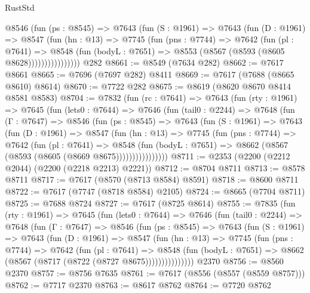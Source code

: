 \begin{lexlean}{RustStd}
\begin{coremodule}
              @8546
                (fun (ps : @8545) =>
                @7643
                  (fun (S : @1961) =>
                  @7643
                    (fun (D : @1961) =>
                    @8547
                      (fun (hn : @13) =>
                      @7745
                        (fun (pns : @7744) =>
                        @7642
                          (fun (pl : @7641) =>
                          @8548
                            (fun (bodyL : @7651) => @8553 (@8567 (@8593 (@8605 @8628))))))))))))))))
    @282
@8661 := @8549 (@7634 @282)
@8662 := @7617 @8661
@8665 := @7696 (@7697 @282) @8411
@8669 := @7617 (@7688 (@8665 @8610) @8614)
@8670 := @7722 @282
@8675 := @8619 (@8620 @8670 @8414 @8581 @8583)
@8704 := @7832
    (fun (rc : @7641) =>
    @7643
      (fun (rty : @1961) =>
      @7645
        (fun (lets0 : @7644) =>
        @7646
          (fun (tail0 : @2244) =>
          @7648
            (fun (Γ : @7647) =>
            @8546
              (fun (ps : @8545) =>
              @7643
                (fun (S : @1961) =>
                @7643
                  (fun (D : @1961) =>
                  @8547
                    (fun (hn : @13) =>
                    @7745
                      (fun (pns : @7744) =>
                      @7642
                        (fun (pl : @7641) =>
                        @8548
                          (fun (bodyL : @7651) =>
                          @8662 (@8567 (@8593 (@8605 (@8669 @8675))))))))))))))))
@8711 := @2353 (@2200 (@2212 @2044) (@2200 (@2218 @2213) @2221))
@8712 := @8704 @8711
@8713 := @8578 @8711
@8717 := @7617 (@8570 (@8713 @8584) @8591)
@8718 := @8600 @8711
@8722 := @7617 (@7747 (@8718 @8584) @2105)
@8724 := @8665 (@7704 @8711)
@8725 := @7688 @8724
@8727 := @7617 (@8725 @8614)
@8755 := @7835
    (fun (rty : @1961) =>
    @7645
      (fun (lets0 : @7644) =>
      @7646
        (fun (tail0 : @2244) =>
        @7648
          (fun (Γ : @7647) =>
          @8546
            (fun (ps : @8545) =>
            @7643
              (fun (S : @1961) =>
              @7643
                (fun (D : @1961) =>
                @8547
                  (fun (hn : @13) =>
                  @7745
                    (fun (pns : @7744) =>
                    @7642
                      (fun (pl : @7641) =>
                      @8548
                        (fun (bodyL : @7651) =>
                        @8662 (@8567 (@8717 (@8722 (@8727 @8675)))))))))))))))
    @2370
@8756 := @8560 @2370
@8757 := @8756 @7635
@8761 := @7617 (@8556 (@8557 (@8559 @8757)))
@8762 := @7717 @2370
@8763 := @8617 @8762
@8764 := @7720 @8762

\end{coremodule}
\end{lexlean}
